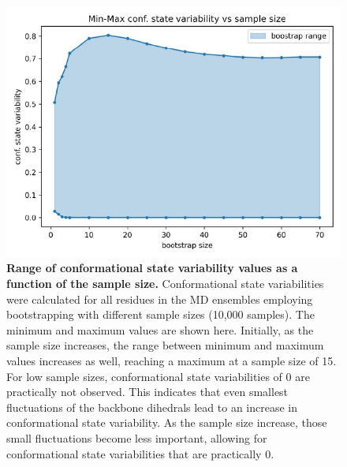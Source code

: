 \begin{figure}[H]
    \centering
    \includegraphics[width=0.9\linewidth]{constava//sup_figs/supfig3.pdf}
    \caption{\textbf{Range of conformational state variability values as a function of the sample size.} Conformational state variabilities were calculated for all residues in the MD ensembles employing bootstrapping with different sample sizes (10,000 samples). The minimum and maximum values are shown here. Initially, as the sample size increases, the range between minimum and maximum values increases as well, reaching a maximum at a sample size of 15. For low sample sizes, conformational state variabilities of 0 are practically not observed. This indicates that even smallest fluctuations of the backbone dihedrals lead to an increase in conformational state variability. As the sample size increase, those small fluctuations become less important, allowing for conformational state variabilities that are practically 0.}
    \label{fig:sup_fig_constava:range}
\end{figure}

